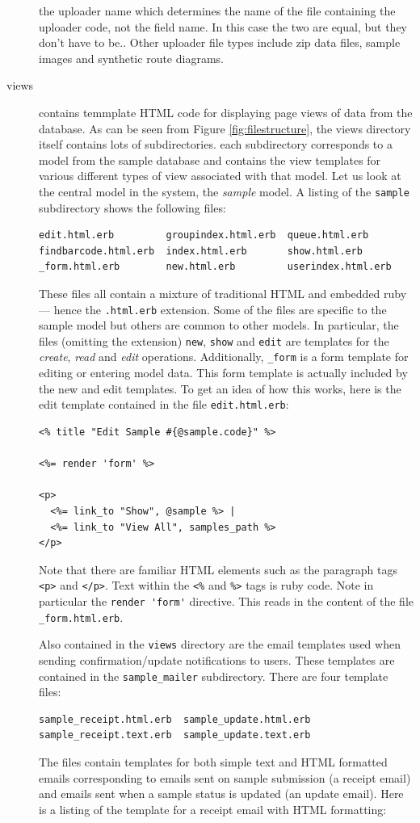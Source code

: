 \documentclass[12pt,twoside]{article}
\begin{document}
\begin{description}
{the uploader name which determines the name of the file containing the
uploader code, not the field name. In this case the two are equal, but
they don't have to be.}.
Other uploader file types include zip data files, sample images and
synthetic route diagrams.
\item[views]
contains temmplate HTML code for displaying page views of data from the
database. As can be seen from Figure \ref{fig:filestructure}, the views
directory itself contains lots of subdirectories. each subdirectory
corresponds to a model from the sample database and contains the view
templates for various different types of view associated with that model.
Let us look at the central model in the system, the \emph{sample} model.
A listing of the \verb=sample= subdirectory shows the following files:
\begin{verbatim}
edit.html.erb         groupindex.html.erb  queue.html.erb
findbarcode.html.erb  index.html.erb       show.html.erb
_form.html.erb        new.html.erb         userindex.html.erb
\end{verbatim}
These files all contain a mixture of traditional HTML and embedded ruby
--- hence the \verb=.html.erb= extension. Some of the files are specific
to the sample model but others are common to other models. In particular,
the files (omitting the extension) \verb=new=, \verb=show= and \verb=edit=
are templates for the \emph{create}, \emph{read} and
\emph{edit} operations.
Additionally, \verb=_form= is a form template for editing or entering 
model data. This form template is actually included by the new and edit
templates.
To get an idea of how this works, here is the edit template contained
in the file \verb=edit.html.erb=:

\scriptsize
\begin{verbatim}
<% title "Edit Sample #{@sample.code}" %>

<%= render 'form' %>

<p>
  <%= link_to "Show", @sample %> |
  <%= link_to "View All", samples_path %>
</p>
\end{verbatim}
\normalsize

Note that there are familiar HTML elements such as the paragraph tags
\verb=<p>= and \verb=</p>=. Text within the \verb=<%= and \verb=%>=
tags is ruby code. Note in particular the \verb=render 'form'= directive.
This reads in the content of the file \verb=_form.html.erb=.

Also contained in the \verb=views= directory are the email templates used
when sending confirmation/update notifications to users. These 
templates are contained in the \verb=sample_mailer= subdirectory.
There are four template files:
\begin{verbatim}
sample_receipt.html.erb  sample_update.html.erb
sample_receipt.text.erb  sample_update.text.erb
\end{verbatim}
The files contain templates for both simple text and HTML formatted emails
corresponding to emails sent on sample submission (a receipt email)
and emails sent when a sample status is updated (an update email).
Here is a listing of the template for a receipt email with HTML
formatting:


\end{description}
\end{document}
